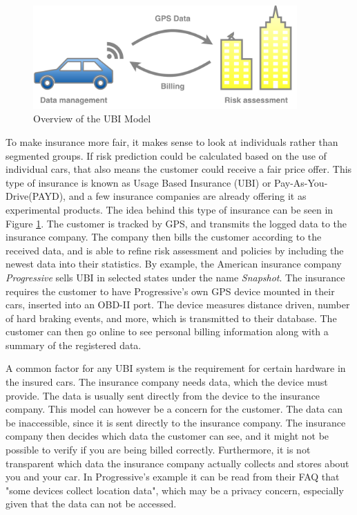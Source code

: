 \begin{figure}[tb]
\centering
\includegraphics[width=0.9\textwidth]{Pictures/Overview}
\caption{Overview of the UBI Model}
\label{fig:overview}
\end{figure}

To make insurance more fair, it makes sense to look at individuals rather than segmented groups. If risk prediction could be calculated based on the use of individual cars, that also means the customer could receive a fair price offer. This type of insurance is known as Usage Based Insurance (UBI) or Pay-As-You-Drive(PAYD), and a few insurance companies are already offering it as experimental products. The idea behind this type of insurance can be seen in Figure \ref{fig:overview}. The customer is tracked by GPS, and transmits the logged data to the insurance company. The company then bills the customer according to the received data, and is able to refine risk assessment and policies by including the newest data into their statistics.
By example, the American insurance company \textit{Progressive} sells UBI in selected states under the name \textit{Snapshot}\cite{snapshot}. The insurance requires the customer to have Progressive's own GPS device mounted in their cars, inserted into an OBD-II port. The device measures distance driven, number of hard braking events, and more, which is transmitted to their database. The customer can then go online to see personal billing information along with a summary of the registered data.

A common factor for any UBI system is the requirement for certain hardware in the insured cars. The insurance company needs data, which the device must provide. The data is usually sent directly from the device to the insurance company. This model can however be a concern for the customer. The data can be inaccessible, since it is sent directly to the insurance company. The insurance company then decides which data the customer can see, and it might not be possible to verify if you are being billed correctly. Furthermore, it is not transparent which data the insurance company actually collects and stores about you and your car. In Progressive's example it can be read from their FAQ that "some devices collect location data", which may be a privacy concern, especially given that the data can not be accessed.

